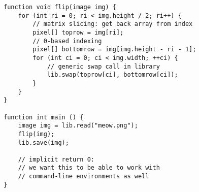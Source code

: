 \begin{lstlisting}[caption={flip.lpx},label=lst:flip]
function void flip(image img) {
	for (int ri = 0; ri < img.height / 2; ri++) {
		// matrix slicing: get back array from index
		pixel[] toprow = img[ri];
		// 0-based indexing
		pixel[] bottomrow = img[img.height - ri - 1];
		for (int ci = 0; ci < img.width; ++ci) {
			// generic swap call in library
			lib.swap(toprow[ci], bottomrow[ci]);
		}
	}
}

function int main () {
	image img = lib.read("meow.png");
	flip(img);
	lib.save(img);
	
	// implicit return 0:
	// we want this to be able to work with
	// command-line environments as well
}
\end{lstlisting}
